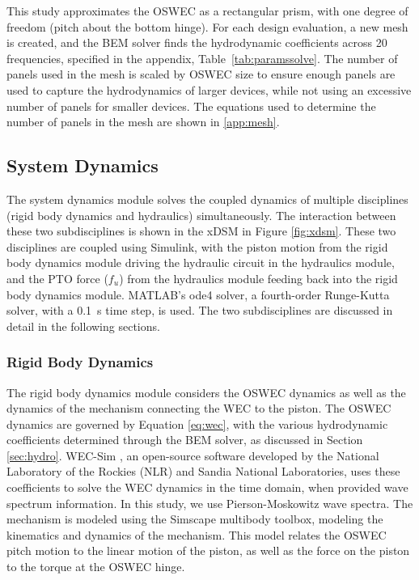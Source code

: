 \documentclass[a4paper,12pt]{elsarticle}
\begin{document}
This study approximates the OSWEC as a rectangular prism, with one degree of freedom (pitch about the bottom hinge). For each design evaluation, a new mesh is created, and the BEM solver finds the hydrodynamic coefficients across 20 frequencies, specified in the appendix, Table~\ref{tab:paramssolve}. The number of panels used in the mesh is scaled by OSWEC size to ensure enough panels are used to capture the hydrodynamics of larger devices, while not using an excessive number of panels for smaller devices. The equations used to determine the number of panels in the mesh are shown in \ref{app:mesh}.

\subsection{System Dynamics} \label{sec:sysdyn}
The system dynamics module solves the coupled dynamics of multiple disciplines (rigid body dynamics and hydraulics) simultaneously. The interaction between these two subdisciplines is shown in the xDSM in Figure \ref{fig:xdsm}. These two disciplines are coupled using Simulink, with the piston motion from the rigid body dynamics module driving the hydraulic circuit in the hydraulics module, and the PTO force ($f_u$) from the hydraulics module feeding back into the rigid body dynamics module. MATLAB's ode4 solver, a fourth-order Runge-Kutta solver, with a 0.1~s time step, is used. The two subdisciplines are discussed in detail in the following sections.

\subsubsection{Rigid Body Dynamics}\label{sec:rigidbody}
The rigid body dynamics module considers the OSWEC dynamics as well as the dynamics of the mechanism connecting the WEC to the piston. The OSWEC dynamics are governed by Equation \ref{eq:wec}, with the various hydrodynamic coefficients determined through the BEM solver, as discussed in Section \ref{sec:hydro}. WEC-Sim \cite{wecsim}, an open-source software developed by the National Laboratory of the Rockies (NLR) and Sandia National Laboratories, uses these coefficients to solve the WEC dynamics in the time domain, when provided wave spectrum information. In this study, we use Pierson-Moskowitz wave spectra. The mechanism is modeled using the Simscape multibody toolbox, modeling the kinematics and dynamics of the mechanism. This model relates the OSWEC pitch motion to the linear motion of the piston, as well as the force on the piston to the torque at the OSWEC hinge. 
\end{document}
